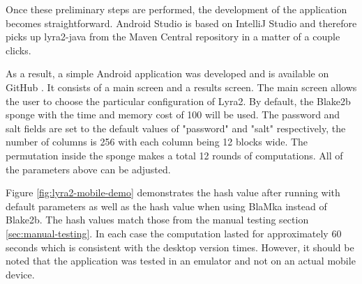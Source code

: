 Once these preliminary steps are performed, the development of the application becomes straightforward. Android Studio is based on IntelliJ Studio and therefore picks up lyra2-java from the Maven Central repository in a matter of a couple clicks.

As a result, a simple Android application was developed and is available on GitHub \cite{github:2017:lyra2-mobile}. It consists of a main screen and a results screen. The main screen allows the user to choose the particular configuration of Lyra2. By default, the Blake2b sponge with the time and memory cost of 100 will be used. The password and salt fields are set to the default values of "password" and "salt" respectively, the number of columns is 256 with each column being 12 blocks wide. The permutation inside the sponge makes a total 12 rounds of computations. All of the parameters above can be adjusted.

Figure \ref{fig:lyra2-mobile-demo} demonstrates the hash value after running with default parameters as well as the hash value when using BlaMka instead of Blake2b. The hash values match those from the manual testing section \ref{sec:manual-testing}. In each case the computation lasted for approximately 60 seconds which is consistent with the desktop version times. However, it should be noted that the application was tested in an emulator and not on an actual mobile device.

